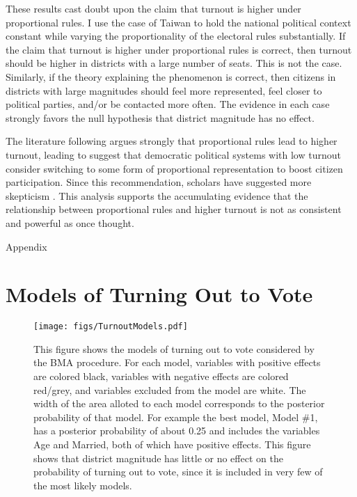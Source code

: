 \documentclass[12pt]{article}
\begin{document}
These results cast doubt upon the claim that turnout is higher under proportional rules. I use the case of Taiwan to hold the national political context constant while varying the proportionality of the electoral rules substantially. If the claim that turnout is higher under proportional rules is correct, then turnout should be higher in districts with a large number of seats. This is not the case. Similarly, if the theory explaining the phenomenon is correct, then citizens in districts with large magnitudes should feel more represented, feel closer to political parties, and/or be contacted more often. The evidence in each case strongly favors the null hypothesis that district magnitude has no effect.

The literature following \cite{Powell1986} argues strongly that proportional rules lead to higher turnout, leading \cite{Lijphart1997} to suggest that democratic political systems with low turnout consider switching to some form of proportional representation to boost citizen participation. Since this recommendation, scholars have suggested more skepticism \citep{BlaisAarts2006}. This analysis supports the accumulating evidence that the relationship between proportional rules and higher turnout is not as consistent and powerful as once thought. 

\clearpage

\appendix
\setcounter{figure}{0}
\renewcommand{\thefigure}{A\arabic{figure}}
\begin{center}
{\LARGE Appendix}
\end{center}

\section{Models of Turning Out to Vote}

\begin{figure}[h!]
\centering
\texttt{[image: figs/TurnoutModels.pdf]}
\caption{This figure shows the models of turning out to vote considered by the BMA procedure. For each model, variables with positive effects are colored black, variables with negative effects are colored red/grey, and variables excluded from the model are white. The width of the area alloted to each model corresponds to the posterior probability of that model. For example the best model, Model \#1, has a posterior probability of about 0.25 and includes the variables Age and Married, both of which have positive effects. This figure shows that district magnitude has little or no effect on the probability of turning out to vote, since it is included in very few of the most likely models.}\label{fig:TurnoutModels}
\end{figure}
\end{document}
